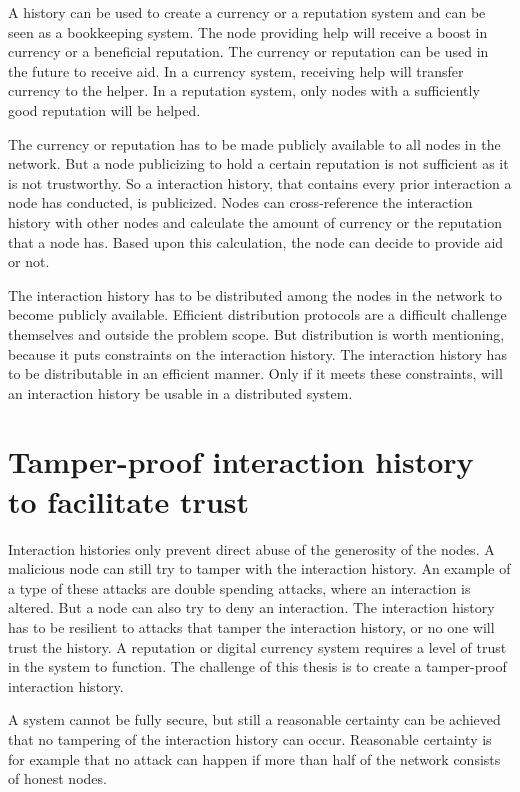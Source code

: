 A history can be used to create a currency or a reputation system
and can be seen as a bookkeeping system.
The node providing help will receive a boost in currency or a beneficial reputation.
The currency or reputation can be used in the future to receive aid.
In a currency system, receiving help will transfer currency to the helper.
In a reputation system, only nodes with a sufficiently good reputation will be helped.

The currency or reputation has to be made publicly available to all nodes in the network.
But a node publicizing to hold a certain reputation is not sufficient as it is not trustworthy.
So a interaction history, that contains every prior interaction a node has conducted, is publicized.
Nodes can cross-reference the interaction history with other nodes and calculate the amount of currency 
or the reputation that a node has.
Based upon this calculation, the node can decide to provide aid or not.

The interaction history has to be distributed among the nodes in the network
to become publicly available.
Efficient distribution protocols are a difficult challenge themselves and outside the problem scope.
But distribution is worth mentioning, because it puts constraints on the interaction history.
The interaction history has to be distributable in an efficient manner.
Only if it meets these constraints, will an interaction history be usable in a distributed system.

\section{Tamper-proof interaction history to facilitate trust}
Interaction histories only prevent direct abuse of the generosity of the nodes.
A malicious node can still try to tamper with the interaction history.
An example of a type of these attacks are double spending attacks\cite{Nakamoto-bitcoin},
where an interaction is altered.
But a node can also try to deny an interaction.
The interaction history has to be resilient to attacks that tamper the interaction history, 
or no one will trust the history. 
A reputation or digital currency system requires a level of trust in the system to function.
The challenge of this thesis is to create a tamper-proof interaction history.

A system cannot be fully secure, 
but still a reasonable certainty can be achieved that no tampering of the interaction history can occur.
Reasonable certainty is for example that no attack can happen 
if more than half of the network consists of honest nodes.

